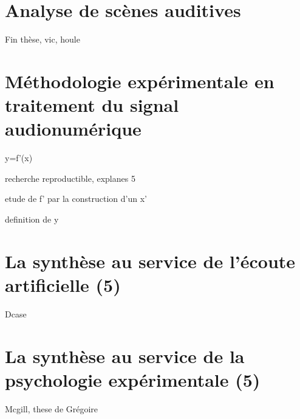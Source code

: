\section{Analyse de scènes auditives}

Fin thèse, vic, houle

\section{Méthodologie expérimentale en traitement du signal audionumérique}

y=f'(x)

recherche reproductible, explanes 5

etude de f' par la construction d'un x'

definition de y

\section{La synthèse au service de l'écoute artificielle (5)}

Dcase

\section{La synthèse au service de la psychologie expérimentale (5)}

Mcgill, these de Grégoire
